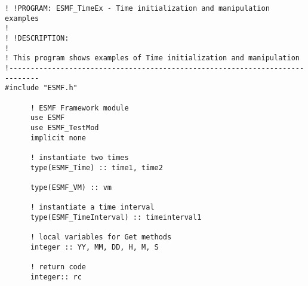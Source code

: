  
\setlength{\oldparskip}{\parskip}
\setlength{\parskip}{1.5ex}
\setlength{\oldparindent}{\parindent}
\setlength{\parindent}{0pt}
\setlength{\oldbaselineskip}{\baselineskip}
\setlength{\baselineskip}{11pt}
 
\def\bv{\begin{verbatim}}
\def\ev{\end{verbatim}}
\def\be{\begin{equation}}
\def\ee{\end{equation}}
\def\bea{\begin{eqnarray}}
\def\eea{\end{eqnarray}}
\def\bi{\begin{itemize}}
\def\ei{\end{itemize}}
\def\bn{\begin{enumerate}}
\def\en{\end{enumerate}}
\def\bd{\begin{description}}
\def\ed{\end{description}}
\def\({\left (}
\def\){\right )}
\def\[{\left [}
\def\]{\right ]}
\def\<{\left  \langle}
\def\>{\right \rangle}
\def\cI{{\cal I}}
\def\diag{\mathop{\rm diag}}
\def\tr{\mathop{\rm tr}}


 

 \begin{verbatim}
! !PROGRAM: ESMF_TimeEx - Time initialization and manipulation examples
!
! !DESCRIPTION:
!
! This program shows examples of Time initialization and manipulation
!-----------------------------------------------------------------------------
#include "ESMF.h"

      ! ESMF Framework module
      use ESMF
      use ESMF_TestMod
      implicit none

      ! instantiate two times
      type(ESMF_Time) :: time1, time2

      type(ESMF_VM) :: vm

      ! instantiate a time interval
      type(ESMF_TimeInterval) :: timeinterval1

      ! local variables for Get methods
      integer :: YY, MM, DD, H, M, S

      ! return code
      integer:: rc
 
\end{verbatim}
 
